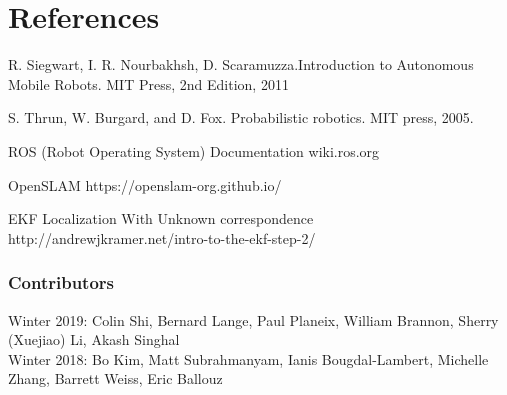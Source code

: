 \documentclass[twoside]{article}
\begin{document}
\section {References}
\begin{enumerate}[label={[\arabic*]}]
\item R. Siegwart, I. R. Nourbakhsh, D. Scaramuzza.Introduction to Autonomous Mobile Robots. MIT Press, 2nd Edition, 2011
\item S. Thrun, W. Burgard, and D. Fox. Probabilistic robotics. MIT press, 2005.
\item ROS (Robot Operating System) Documentation wiki.ros.org
\item OpenSLAM https://openslam-org.github.io/
\item EKF Localization With Unknown correspondence http://andrewjkramer.net/intro-to-the-ekf-step-2/


\subsubsection*{Contributors}
Winter 2019: Colin Shi, Bernard Lange, Paul Planeix, William Brannon, Sherry (Xuejiao) Li, Akash Singhal
\\
Winter 2018: Bo Kim, Matt Subrahmanyam, Ianis Bougdal-Lambert, Michelle Zhang, Barrett Weiss, Eric Ballouz


\end{enumerate}
\end{document}
